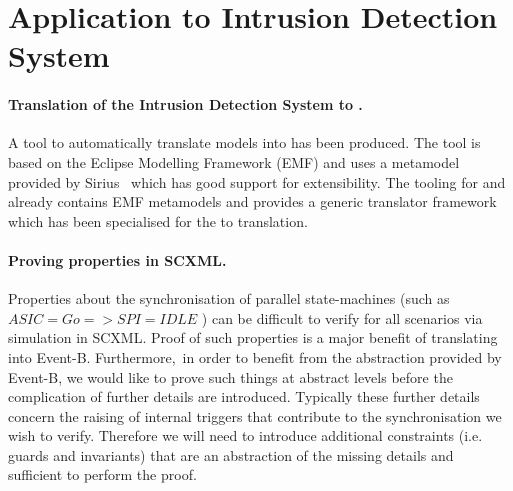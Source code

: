 
\section{Application to Intrusion Detection System}
\label{sec:example}

\paragraph{Translation of the Intrusion Detection System to \EventB.}
A tool to automatically translate \SCXML models into \iUMLB has been produced. 
The tool is based on the Eclipse Modelling Framework (EMF) and uses a \SCXML metamodel provided by Sirius~\cite{siriuswebsite} which has good support for extensibility. 
The tooling for \iUMLB and \EventB already contains EMF metamodels and provides a generic translator framework which has been specialised for the \SCXML to \iUMLB translation. 

\paragraph{Proving properties in SCXML.}
Properties about the synchronisation of parallel state-machines (such as $ASIC=Go => SPI=IDLE$
) can be difficult to verify for all scenarios via simulation in SCXML. 
Proof of such properties is a major benefit of translating into Event-B.  
Furthermore, in order to benefit from the abstraction provided by Event-B, we would like to prove such things at abstract levels before the complication of further details are introduced. Typically these further details concern the raising of internal triggers that contribute to the synchronisation we wish to verify. Therefore we will need to introduce additional constraints (i.e. guards and invariants) that are an abstraction of the missing details and sufficient to perform the proof.


